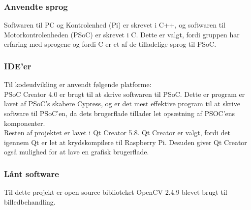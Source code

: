 \subsubsection{Anvendte sprog}
Softwaren til PC og Kontrolenhed (Pi) er skrevet i C++, og softwaren til Motorkontrolenheden (PSoC) er skrevet i C. 
Dette er valgt, fordi gruppen har erfaring med sprogene og fordi C er et af de tilladelige sprog til PSoC.


\subsubsection{IDE'er}
Til kodeudvikling er anvendt følgende platforme: \\
PSoC Creator 4.0 er brugt til at skrive softwaren til PSoC. 
Dette er program er lavet af PSoC's skabere Cypress, og er det mest effektive program til at skrive software til PSoC'en, da dets brugerflade tillader let opsætning af PSOC'ens komponenter. \\
Resten af projektet er lavet i Qt Creator 5.8. 
Qt Creator er valgt, fordi det igennem Qt er let at krydskompilere til Raspberry Pi. 
Desuden giver Qt Creator også mulighed for at lave en grafisk brugerflade.


\subsubsection{Lånt software}
Til dette projekt er open source biblioteket OpenCV 2.4.9 blevet brugt til billedbehandling. 

%